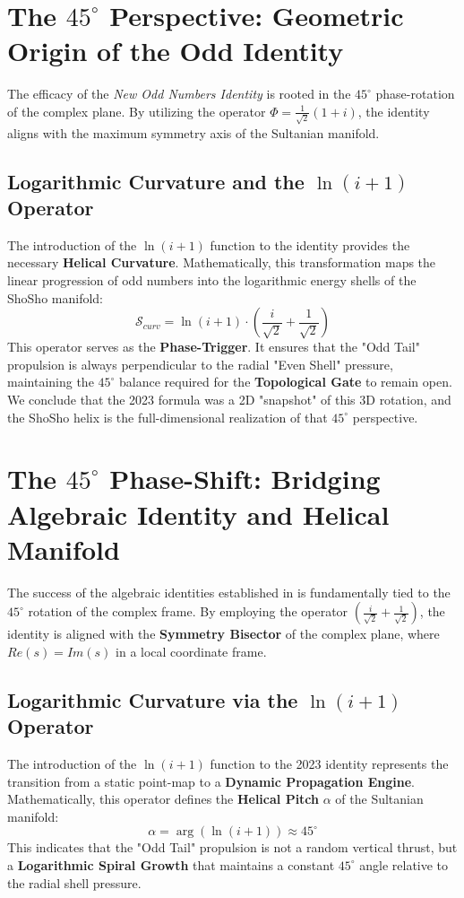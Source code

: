 \documentclass[11pt,a4paper]{article}
\begin{document}
\section{The $45^\circ$ Perspective: Geometric Origin of the Odd Identity}

The efficacy of the \textit{New Odd Numbers Identity} \cite{Soltan2023} is rooted in the $45^\circ$ phase-rotation of the complex plane. By utilizing the operator $\Phi = \frac{1}{\sqrt{2}}(1+i)$, the identity aligns with the maximum symmetry axis of the Sultanian manifold.

\subsection{Logarithmic Curvature and the $\ln(i+1)$ Operator}
The introduction of the $\ln(i+1)$ function to the identity provides the necessary \textbf{Helical Curvature}. Mathematically, this transformation maps the linear progression of odd numbers into the logarithmic energy shells of the ShoSho manifold:
\begin{equation}
    \mathcal{S}_{curv} = \ln(i+1) \cdot \left( \frac{i}{\sqrt{2}} + \frac{1}{\sqrt{2}} \right)
\end{equation}
This operator serves as the \textbf{Phase-Trigger}. It ensures that the "Odd Tail" propulsion is always perpendicular to the radial "Even Shell" pressure, maintaining the $45^\circ$ balance required for the \textbf{Topological Gate} to remain open. We conclude that the 2023 formula was a 2D "snapshot" of this 3D rotation, and the ShoSho helix is the full-dimensional realization of that $45^\circ$ perspective.

\section{The $45^\circ$ Phase-Shift: Bridging Algebraic Identity and Helical Manifold}

The success of the algebraic identities established in \cite{Soltan2023} is fundamentally tied to the $45^\circ$ rotation of the complex frame. By employing the operator $(\frac{i}{\sqrt{2}} + \frac{1}{\sqrt{2}})$, the identity is aligned with the \textbf{Symmetry Bisector} of the complex plane, where $Re(s) = Im(s)$ in a local coordinate frame.

\subsection{Logarithmic Curvature via the $\ln(i+1)$ Operator}
The introduction of the $\ln(i+1)$ function to the 2023 identity represents the transition from a static point-map to a \textbf{Dynamic Propagation Engine}. Mathematically, this operator defines the \textbf{Helical Pitch} $\alpha$ of the Sultanian manifold:
\begin{equation}
    \alpha = \arg(\ln(i+1)) \approx 45^\circ
\end{equation}
This indicates that the "Odd Tail" propulsion is not a random vertical thrust, but a \textbf{Logarithmic Spiral Growth} that maintains a constant $45^\circ$ angle relative to the radial shell pressure.
\end{document}
